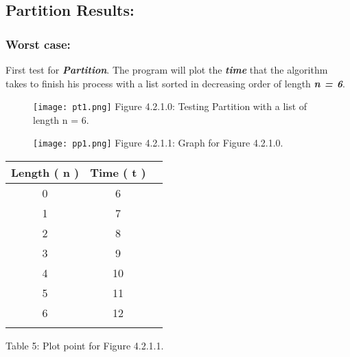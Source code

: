 \subsection{Partition Results:}

\subsubsection{Worst case:}

First test for {\bfseries\itshape Partition}. The program will plot the {\bfseries\itshape time} that the algorithm takes to finish his process with a list sorted in decreasing order of length {\bfseries\itshape n = 6}. \hfill \break

{\bfseries\itshape\color{armygreen}{Observation:}} {\itshape\color{armygreen}{We are going to analyze the worst case when the list it's sorted in decreasing order.}} \hfill \break

\begin{figure}[H]
\texttt{[image: pt1.png]}
\centering \linebreak \linebreak Figure 4.2.1.0: Testing Partition with a list of length n = 6.
\end{figure} \hfill 

\begin{multicols}{2}
\begin{figure}[H]
\texttt{[image: pp1.png]}
\centering \linebreak \linebreak Figure 4.2.1.1: Graph for Figure 4.2.1.0.
\end{figure} \hfill

\begin{center}
\begin{itemize}

\end{itemize}
{\Large
\begin{tabular}[.5cm]{ c c c }
\toprule
Length ( n ) & Time ( t ) \\
\midrule
0 & 6 \\
\cmidrule {1-2}
1 & 7 \\
\cmidrule {1-2}
2 & 8 \\
\cmidrule {1-2}
3 & 9 \\
\cmidrule {1-2}
4 & 10 \\
\cmidrule {1-2}
5 & 11 \\
\cmidrule {1-2}
6 & 12 \\
\bottomrule
\linebreak
\end{tabular}}
\linebreak \linebreak Table 5: Plot point for Figure 4.2.1.1.
\end{center}
\end{multicols}


